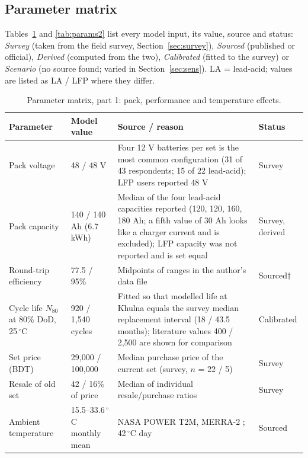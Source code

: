 \documentclass[11pt,a4paper]{article}
\newcommand{\nSurvey}{43}
\newcommand{\nLA}{22}
\newcommand{\replMedLA}{18}
\newcommand{\nLFP}{5}
\newcommand{\replMedLFP}{43.5}
\newcommand{\fourBat}{31}
\newcommand{\fourBatLA}{15}
\newcommand{\ahMed}{140}
\newcommand{\packKWh}{6.7}
\newcommand{\NcalLA}{920}
\newcommand{\NcalLFP}{1{,}540}
\newcommand{\priceLA}{29{,}000}
\newcommand{\priceLFP}{100{,}000}
\newcommand{\scrapLA}{42}
\newcommand{\scrapLFP}{16}
\begin{document}
\subsection{Parameter matrix}
Tables~\ref{tab:params1} and \ref{tab:params2} list every model input, its value, source and status: \emph{Survey} (taken from the field survey, Section~\ref{sec:survey}), \emph{Sourced} (published or official), \emph{Derived} (computed from the two), \emph{Calibrated} (fitted to the survey) or \emph{Scenario} (no source found; varied in Section~\ref{sec:sens}). LA = lead-acid; values are listed as LA / LFP where they differ.
\begin{table}[t]
\caption{Parameter matrix, part 1: pack, performance and temperature effects.}
\label{tab:params1}
\centering\footnotesize
\renewcommand{\arraystretch}{1.1}
\begin{tabular}{p{2.5cm}p{3.3cm}p{6.8cm}p{1.8cm}}
\hline
Parameter & Model value & Source / reason & Status \\
\hline
Pack voltage & 48 / 48 V & Four 12 V batteries per set is the most common configuration (\fourBat{} of \nSurvey{} respondents; \fourBatLA{} of \nLA{} lead-acid); LFP users reported 48 V & Survey \\
Pack capacity & \ahMed{} / \ahMed{} Ah (\packKWh{} kWh) & Median of the four lead-acid capacities reported (120, 120, 160, 180 Ah; a fifth value of 30 Ah looks like a charger current and is excluded); LFP capacity was not reported and is set equal & Survey, derived \\
Round-trip efficiency & 77.5 / 95\% & Midpoints of ranges in the author's data file \cite{keshan2016} & Sourced$\dagger$ \\
Cycle life $N_{80}$ at 80\% DoD, 25\,$^\circ$C & \NcalLA{} / \NcalLFP{} cycles & Fitted so that modelled life at Khulna equals the survey median replacement interval (\replMedLA{} / \replMedLFP{} months); literature values 400 / 2{,}500 \cite{keshan2016} are shown for comparison & Calibrated \\
Set price (BDT) & \priceLA{} / \priceLFP{} & Median purchase price of the current set (survey, $n$ = \nLA{} / \nLFP{}) & Survey \\
Resale of old set & \scrapLA{} / \scrapLFP{}\% of price & Median of individual resale/purchase ratios & Survey \\
Ambient temperature & 15.5--33.6\,$^\circ$C monthly mean & NASA POWER T2M, MERRA-2 \cite{nasa_power,gelaro2017}; 42\,$^\circ$C day \cite{heat2025} & Sourced \\

\end{tabular}
\end{table}
\end{document}
